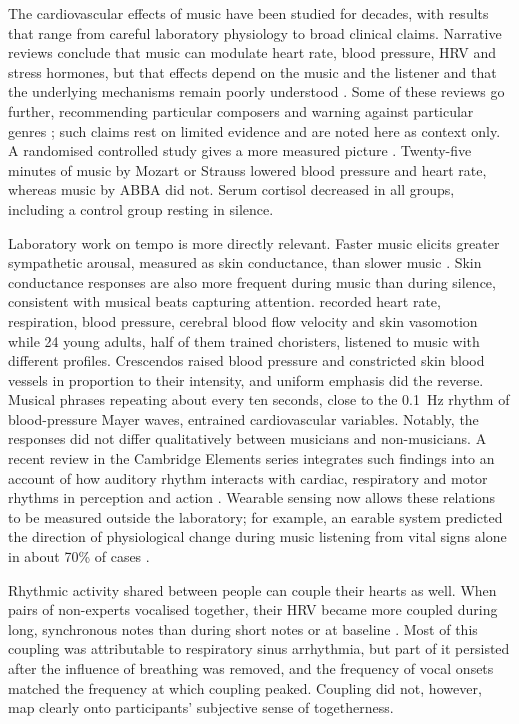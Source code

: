 The cardiovascular effects of music have been studied for decades, with results that range from careful laboratory physiology to broad clinical claims. Narrative reviews conclude that music can modulate heart rate, blood pressure, HRV and stress hormones, but that effects depend on the music and the listener and that the underlying mechanisms remain poorly understood \citep{trappe2010,cervellin2011}. Some of these reviews go further, recommending particular composers and warning against particular genres \citep{trappe2010}; such claims rest on limited evidence and are noted here as context only. A randomised controlled study gives a more measured picture \citep{trappe2016}. Twenty-five minutes of music by Mozart or Strauss lowered blood pressure and heart rate, whereas music by ABBA did not. Serum cortisol decreased in all groups, including a control group resting in silence.

Laboratory work on tempo is more directly relevant. Faster music elicits greater sympathetic arousal, measured as skin conductance, than slower music \citep{dillman2007}. Skin conductance responses are also more frequent during music than during silence, consistent with musical beats capturing attention. \citet{bernardi2009} recorded heart rate, respiration, blood pressure, cerebral blood flow velocity and skin vasomotion while 24 young adults, half of them trained choristers, listened to music with different profiles. Crescendos raised blood pressure and constricted skin blood vessels in proportion to their intensity, and uniform emphasis did the reverse. Musical phrases repeating about every ten seconds, close to the 0.1~Hz rhythm of blood-pressure Mayer waves, entrained cardiovascular variables. Notably, the responses did not differ qualitatively between musicians and non-musicians. A recent review in the Cambridge Elements series integrates such findings into an account of how auditory rhythm interacts with cardiac, respiratory and motor rhythms in perception and action \citep{wright2022}. Wearable sensing now allows these relations to be measured outside the laboratory; for example, an earable system predicted the direction of physiological change during music listening from vital signs alone in about 70\% of cases \citep{butkow2024}.

Rhythmic activity shared between people can couple their hearts as well. When pairs of non-experts vocalised together, their HRV became more coupled during long, synchronous notes than during short notes or at baseline \citep{ruizblais2020}. Most of this coupling was attributable to respiratory sinus arrhythmia, but part of it persisted after the influence of breathing was removed, and the frequency of vocal onsets matched the frequency at which coupling peaked. Coupling did not, however, map clearly onto participants' subjective sense of togetherness.

